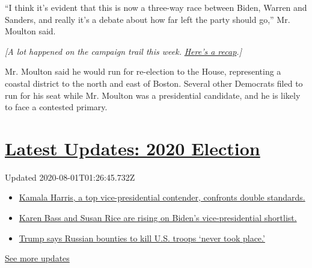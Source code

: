 ``I think it's evident that this is now a three-way race between Biden,
Warren and Sanders, and really it's a debate about how far left the
party should go,'' Mr. Moulton said.

\emph{{[}A lot happened on the campaign trail this week.}
\href{https://www.nytimes.com/2019/08/24/us/politics/2020-democratic-presidential-candidates.html}{\emph{Here's
a recap}}\emph{.{]}}

Mr. Moulton said he would run for re-election to the House, representing
a coastal district to the north and east of Boston. Several other
Democrats filed to run for his seat while Mr. Moulton was a presidential
candidate, and he is likely to face a contested primary.

\hypertarget{latest-updates-2020-election}{%
\section{\texorpdfstring{\href{https://www.nytimes.com/2020/07/31/us/elections/biden-vs-trump.html?action=click\&pgtype=Article\&state=default\&region=MAIN_CONTENT_1\&context=storylines_live_updates}{Latest
Updates: 2020
Election}}{Latest Updates: 2020 Election}}\label{latest-updates-2020-election}}

Updated 2020-08-01T01:26:45.732Z

\begin{itemize}
\tightlist
\item
  \href{https://www.nytimes.com/2020/07/31/us/elections/biden-vs-trump.html?action=click\&pgtype=Article\&state=default\&region=MAIN_CONTENT_1\&context=storylines_live_updates\#link-29fdff45}{Kamala
  Harris, a top vice-presidential contender, confronts double
  standards.}
\item
  \href{https://www.nytimes.com/2020/07/31/us/elections/biden-vs-trump.html?action=click\&pgtype=Article\&state=default\&region=MAIN_CONTENT_1\&context=storylines_live_updates\#link-13ec3d9c}{Karen
  Bass and Susan Rice are rising on Biden's vice-presidential
  shortlist.}
\item
  \href{https://www.nytimes.com/2020/07/31/us/elections/biden-vs-trump.html?action=click\&pgtype=Article\&state=default\&region=MAIN_CONTENT_1\&context=storylines_live_updates\#link-49e9a016}{Trump
  says Russian bounties to kill U.S. troops `never took place.'}
\end{itemize}

\href{https://www.nytimes.com/2020/07/31/us/elections/biden-vs-trump.html?action=click\&pgtype=Article\&state=default\&region=MAIN_CONTENT_1\&context=storylines_live_updates}{See
more updates}

